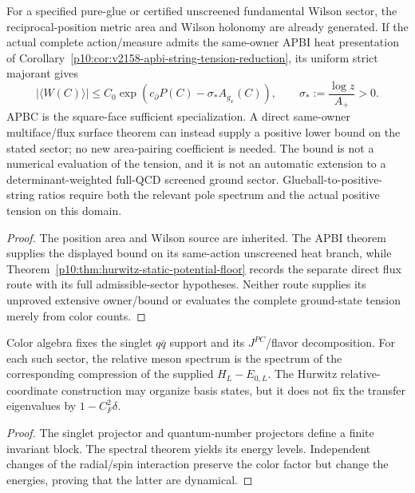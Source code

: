 \documentclass[12pt,a4paper]{article}
\begin{document}
\begin{corollary}
\label{p11:cor:native-string-tension-and-relative-glue-ratios}
For a specified pure-glue or certified unscreened fundamental Wilson sector,
the reciprocal-position metric area and Wilson holonomy are already
generated.  If the actual complete action/measure admits the same-owner APBI
heat presentation of Corollary~\ref{p10:cor:v2158-apbi-string-tension-reduction},
its uniform strict majorant gives
\[
 |\langle W(C)\rangle|
 \le C_0\exp\!\left(c_\partial P(C)-\sigma_*A_{g_x}(C)\right),
 \qquad \sigma_*:=\frac{\log z}{A_+}>0.
\]
APBC is the square-face sufficient specialization.  A direct same-owner
multiface/flux surface theorem can instead supply a positive lower bound on
the stated sector; no new area-pairing coefficient is needed.  The bound is
not a numerical evaluation of the tension, and it is not an automatic
extension to a determinant-weighted full-QCD screened ground sector.
Glueball-to-positive-string ratios require both the relevant pole spectrum
and the actual positive tension on this domain.
\label{p11:eq:native-string-tension-derived-corrected}
\label{p11:eq:compact-glue-string-normalized-ratios}
\label{p11:eq:compact-glue-string-normalized-ratios-numeric}
\end{corollary}
\begin{proof}
The position area and Wilson source are inherited.  The APBI theorem supplies
the displayed bound on its same-action unscreened heat branch, while
Theorem~\ref{p10:thm:hurwitz-static-potential-floor} records the separate direct
flux route with its full admissible-sector hypotheses.  Neither route
supplies its unproved extensive owner/bound or evaluates the complete
ground-state tension merely from color counts.
\end{proof}

\begin{theorem}
\label{p11:thm:light-qqbar-relative-meson-block}

Color algebra fixes the singlet \(q\bar q\) support and its \(J^{PC}\)/flavor decomposition.  For each such sector, the relative meson spectrum is the spectrum of the corresponding compression of the supplied \(H_L-E_{0,L}\).  The Hurwitz relative-coordinate construction may organize basis states, but it does not fix the transfer eigenvalues by \(1-C_F^2\delta\).
\label{p11:eq:qqbar-relative-energy-tower}
\label{p11:eq:qqbar-native-channel-list}
\end{theorem}
\begin{proof}

The singlet projector and quantum-number projectors define a finite invariant block.  The spectral theorem yields its energy levels.  Independent changes of the radial/spin interaction preserve the color factor but change the energies, proving that the latter are dynamical.
\end{proof}
\end{document}

